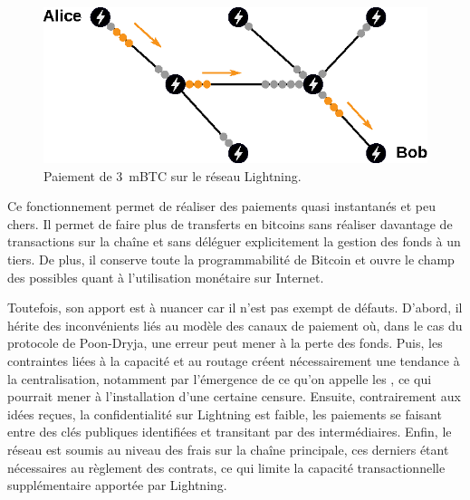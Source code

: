 \begin{figure}[ht]
  \centering
  \includegraphics[scale=1]{img/lightning-network-abacus.eps}
  \caption{Paiement de 3~mBTC sur le réseau Lightning.}
  \label{fig:lightning-network-abacus}
\end{figure}

Ce fonctionnement permet de réaliser des paiements quasi instantanés et peu chers. Il permet de faire plus de transferts en bitcoins sans réaliser davantage de transactions sur la chaîne et sans déléguer explicitement la gestion des fonds à un tiers. De plus, il conserve toute la programmabilité de Bitcoin et ouvre le champ des possibles quant à l'utilisation monétaire sur Internet.

Toutefois, son apport est à nuancer car il n'est pas exempt de défauts. D'abord, il hérite des inconvénients liés au modèle des canaux de paiement où, dans le cas du protocole de Poon-Dryja, une erreur peut mener à la perte des fonds. Puis, les contraintes liées à la capacité et au routage créent nécessairement une tendance à la centralisation, notamment par l'émergence de ce qu'on appelle les , ce qui pourrait mener à l'installation d'une certaine censure. Ensuite, contrairement aux idées reçues, la confidentialité sur Lightning est faible, les paiements se faisant entre des clés publiques identifiées et transitant par des intermédiaires. Enfin, le réseau est soumis au niveau des frais sur la chaîne principale, ces derniers étant nécessaires au règlement des contrats, ce qui limite la capacité transactionnelle supplémentaire apportée par Lightning.


